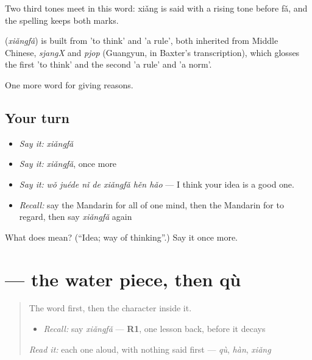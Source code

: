 Two third tones meet in this word: xiǎng is said with a rising tone before fǎ, and the spelling keeps both marks.

\begin{cousinweb}
\textbf{} (\emph{xiǎngfǎ}) is built from  'to think' and  'a rule', both inherited from Middle Chinese, \emph{sjangX} and \emph{pjop} (Guangyun, in Baxter's transcription), which glosses the first 'to think' and the second 'a rule' and 'a norm'.
\end{cousinweb}

\begin{grammarlens}[title={What you've built}]
One more word for giving reasons.
\end{grammarlens}

\subsection*{Your turn}
\begin{itemize}
\raggedright
  \item \emph{Say it:} \emph{xiǎngfǎ}
  \item \emph{Say it:} \emph{xiǎngfǎ}, once more
  \item \emph{Say it:} \emph{wǒ juéde nǐ de xiǎngfǎ hěn hǎo} — I think your idea is a good one.
  \item \emph{Recall:} say the Mandarin for all of one mind, then the Mandarin for to regard, then say \emph{xiǎngfǎ} again
\end{itemize}

\begin{tcolorbox}[breakable,colback=teal!4,colframe=teal!35!black,title={Before you move on}]
What does  mean? (\textquotedblleft{}Idea; way of thinking\textquotedblright{}.) Say it once more.
\end{tcolorbox}
\section[\texorpdfstring{\zh{法} (fǎ)}{法 (fǎ)}]{ — the water piece, then qù}

\label{lesson:ZH-W349-fa-rule}



\begin{quote}
The word first, then the character inside it.

\begin{itemize}
\raggedright
  \item \emph{Recall:} say \emph{xiǎngfǎ} — \textbf{R1}, one lesson back, before it decays
\end{itemize}

\begin{quote}
  
\end{quote}

\emph{Read it:} each one aloud, with nothing said first — \emph{qù}, \emph{hàn}, \emph{xiǎng}
\end{quote}

